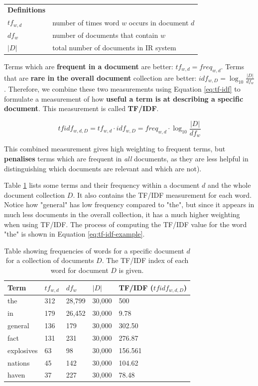 \documentclass{article}
\begin{document}
\paragraph{}

\begin{tabular}{ll}
	\textbf{Definitions} & \\
	$tf_{w,d}$ & number of times word $w$ occurs in document $d$ \\
	$df_w$ & number of documents that contain $w$ \\
	$|D|$ & total number of documents in IR system 
\end{tabular}

Terms which are \textbf{frequent in a document} are better: $tf_{w,d} = freq_{w,d}$. Terms that are \textbf{rare in the overall document} collection are better: $idf_{w,D} = \log_{10} \frac{|D|}{df_w}$. Therefore, we combine these two measurements using Equation \ref{eq:tf-idf} to formulate a measurement of how \textbf{useful a term is at describing  a specific document}. This measurement is called \textbf{TF/IDF}.

\begin{equation}
	tfidf_{w,d,D} = tf_{w,d} \cdot idf_{w,D} = freq_{w,d} \cdot \log_{10} \frac{|D|}{df_w}
	\label{eq:tf-idf}
\end{equation}

This combined measurement gives high weighting to frequent terms, but \textbf{penalises} terms which are frequent in \textit{all} documents, as they are less helpful in distinguishing which documents are relevant and which are not).

Table \ref{tab:tf-idf} lists some terms and their frequency within a document $d$ and the whole document collection $D$. It also contains the TF/IDF measurement for each word. Notice how "general" has low frequency compared to "the", but since it appears in much less documents in the overall collection, it has a much higher weighting when using TF/IDF. The process of computing the TF/IDF value for the word "the" is shown in Equation \ref{eq:tf-idf-example}.

\begin{table}[H]
	\centering
	\begin{tabular}{|l|l|l|l|l|}
		\hline
		\textbf{Term} & $tf_{w,d}$ & $df_w$ & $|D|$ & TF/IDF ($tfidf_{w,d,D}$) \\
		\hline
		the & 312 & 28,799 & 30,000 & 500 \\
		in & 179 & 26,452 & 30,000 & 9.78 \\
		general & 136 & 179 & 30,000 & 302.50 \\
		fact & 131 & 231 & 30,000 & 276.87 \\
		explosives & 63 & 98 & 30,000 & 156.561 \\
		nations & 45 & 142 & 30,000 & 104.62 \\
		haven & 37 & 227 & 30,000 & 78.48 \\
		\hline
	\end{tabular}
	\caption{Table showing frequencies of words for a specific document $d$ for a collection of documents $D$. The TF/IDF index of each word for document $D$ is given.}
	\label{tab:tf-idf}
\end{table}
\end{document}
